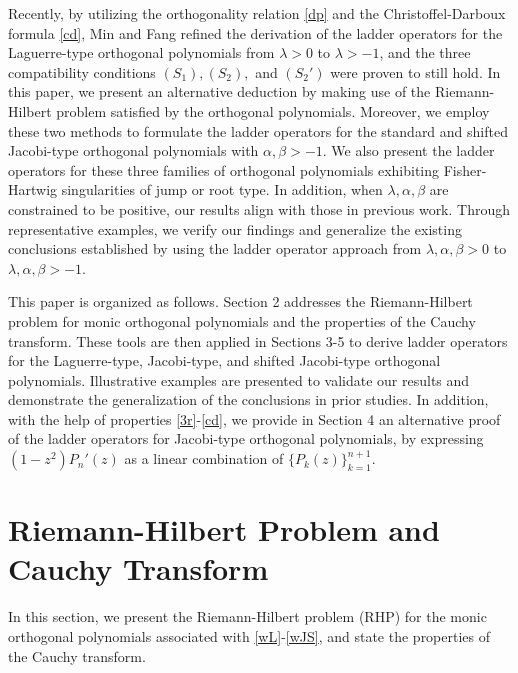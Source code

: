 \documentclass[12pt,a4paper]{article}    %
\numberwithin{equation}{section}
\begin{document}
Recently, by utilizing the orthogonality relation \eqref{dp} and the Christoffel-Darboux formula \eqref{cd}, Min and Fang \cite{MinFang25} refined the derivation of the ladder operators for the Laguerre-type orthogonal polynomials from $\lambda>0$ to $\lambda>-1$, and the three compatibility conditions $(S_1),(S_2),$ and $(S_2')$ were proven to still hold. In this paper, we present an alternative deduction by making use of the Riemann-Hilbert problem satisfied by the orthogonal polynomials. Moreover, we employ these two methods to formulate the ladder operators for the standard and shifted Jacobi-type orthogonal polynomials with $\alpha,\beta>-1$. We also present the ladder operators for these three families of orthogonal polynomials exhibiting Fisher-Hartwig singularities of jump or root type. In addition, when $\lambda,\alpha,\beta$ are constrained to be positive, our results align with those in previous work. Through representative examples, we verify our findings and generalize the existing conclusions established by using the ladder operator approach from $\lambda,\alpha,\beta>0$ to $\lambda,\alpha,\beta>-1$.

This paper is organized as follows. Section 2 addresses the Riemann-Hilbert problem for monic orthogonal polynomials and the properties of the Cauchy transform. These tools are then applied in Sections 3-5 to derive ladder operators for the Laguerre-type, Jacobi-type, and shifted Jacobi-type orthogonal polynomials. Illustrative examples are presented to validate our results and demonstrate the generalization of the conclusions in prior studies. In addition, with the help of properties \eqref{3r}-\eqref{cd}, we provide in Section 4 an alternative proof of the ladder operators for Jacobi-type orthogonal polynomials, by expressing $(1-z^2)P_n'(z)$ as a linear combination of $\{P_k(z)\}_{k=1}^{n+1}$.


\section{Riemann-Hilbert Problem and Cauchy Transform}
In this section, we present the Riemann-Hilbert problem (RHP) for the monic orthogonal polynomials associated with \eqref{wL}-\eqref{wJS}, and state the properties of the Cauchy transform.
\end{document}
